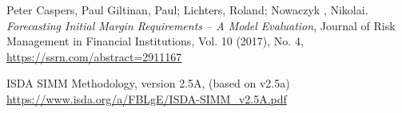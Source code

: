 \documentclass[12pt, a4paper]{article}
\begin{document}
\begin{thebibliography}{*}
 Peter Caspers, Paul Giltinan, Paul; Lichters, Roland; Nowaczyk , Nikolai. {\em Forecasting Initial Margin Requirements – A Model Evaluation}, Journal of Risk Management in Financial Institutions, Vol. 10 (2017), No. 4, \url{https://ssrn.com/abstract=2911167}

 ISDA SIMM Methodology, version 2.5A, (based on v2.5a) \\
  \url{https://www.isda.org/a/FBLgE/ISDA-SIMM\_v2.5A.pdf}

  
\end{thebibliography}

\newpage
{}
\listoftodos[Todo]
\end{document}
